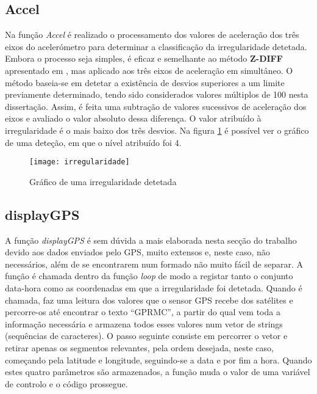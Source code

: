 \subsection{Accel}
\label{sub:accel}

Na função \emph{Accel} é realizado o processamento dos valores de aceleração dos três eixos do acelerómetro para determinar a classificação da irregularidade detetada.
Embora o processo seja simples, é eficaz e semelhante ao método \textbf{Z-DIFF} apresentado em \cite{Mednis2011}, mas aplicado aos três eixos de aceleração em simultâneo.
O método baseia-se em detetar a existência de desvios superiores a um limite previamente determinado, tendo sido considerados valores múltiplos de 100 nesta dissertação.
Assim, é feita uma subtração de valores sucessivos de aceleração dos eixos e avaliado o valor absoluto dessa diferença.
O valor atribuído à irregularidade é o mais baixo dos três desvios.
Na figura \ref{fig:grafico_de_uma_irregularidade_detetada} é possível ver o gráfico de uma deteção, em que o nível atribuído foi 4.

\begin{figure}[hbtp]
	\centering
	\texttt{[image: irregularidade]}
	\caption{Gráfico de uma irregularidade detetada}
	\label{fig:grafico_de_uma_irregularidade_detetada}
\end{figure}

\subsection{displayGPS}
\label{sub:displayGPS}

A função \emph{displayGPS} é sem dúvida a mais elaborada nesta secção do trabalho devido aos dados enviados pelo GPS, muito extensos e, neste caso, não necessários, além de se encontrarem num formado não muito fácil de separar.
A função é chamada dentro da função \emph{loop} de modo a registar tanto o conjunto data-hora como as coordenadas em que a irregularidade foi detetada.
Quando é chamada, faz uma leitura dos valores que o sensor GPS recebe dos satélites e percorre-os até encontrar o texto ``GPRMC'', a partir do qual vem toda a informação necessária e armazena todos esses valores num vetor de strings (sequências de caracteres).
O passo seguinte consiste em percorrer o vetor e retirar apenas os segmentos relevantes, pela ordem desejada, neste caso, começando pela latitude e longitude, seguindo-se a data e por fim a hora.
Quando estes quatro parâmetros são armazenados, a função muda o valor de uma variável de controlo e o código prossegue.


